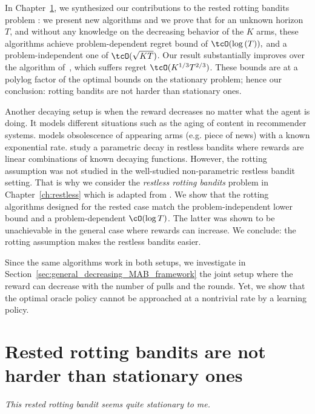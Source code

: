 In Chapter~\ref{ch:rested}, we synthesized our contributions to the rested rotting bandits problem \citep{seznec2019rotting, seznec2020single}: we present new algorithms and we prove that for an unknown horizon $T$, and without any knowledge on the decreasing behavior of the $K$ arms, these algorithms achieve problem-dependent regret bound of $\tcO(\log{(T)}),$ and a problem-independent one of $\tcO(\sqrt{KT})$. Our result substantially improves over the algorithm of~\citet{levine2017rotting}, which suffers regret $\tcO(K^{1/3}T^{2/3})$. These bounds are at a polylog factor of the optimal bounds on the stationary problem; hence our conclusion: rotting bandits are not harder than stationary ones. 

Another decaying setup is when the reward decreases no matter what the agent is doing. It models different situations such as the aging of content in recommender systems. \citet{louedec2016algorithme} models obsolescence of appearing arms (e.g. piece of news) with a known exponential rate. \citet{komiyama2014time-decaying} study a parametric decay in restless bandits where rewards are linear combinations of known decaying functions. However, the rotting assumption was not studied in the well-studied non-parametric restless bandit setting\citep{garivier2011upper-confidence-bound, auer2019adaptively,chen2019new, cheung2019new, russac2019weighted, besson2019generalized, liu2018change-detection, cao2019nearly, besbes2014stochastic}. That is why we consider the  \emph{restless rotting bandits} problem in Chapter~\ref{ch:restless} which is adapted from \citet{seznec2020single}.  We show that the rotting algorithms designed for the rested case match the problem-independent lower bound and a problem-dependent $\cO(\log{T})$. The latter was shown to be unachievable in the general case where rewards can increase. We conclude: the rotting assumption makes the restless bandits easier. 

Since the same algorithms work in both setups, we investigate in Section~\ref{sec:general_decreasing_MAB_framework} the joint setup where the reward can decrease with the number of pulls and the rounds. Yet, we show that the optimal oracle policy cannot be approached at a nontrivial rate by a learning policy.

\chapter{Rested rotting bandits are not harder than stationary ones}
\label{ch:rested}
\vspace{-2.8cm}
\begin{flushright}
\emph{This rested rotting bandit seems quite stationary to me.}
\end{flushright}
\vspace{.85cm}







